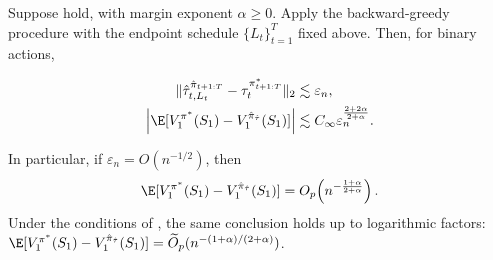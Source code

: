 \documentclass[opre,nonblindrev]{informs4}
\newif\ifonecolumnequations
\newcommand{\az}[1]{{\color{purple} [\textbf{az:}~#1]}}
\newcommand{\norm}[1]{\lVert#1\rVert}
\newcommand{\blipadv}{\tau}
\begin{document}
\begin{theorem}\label{thm-policy-optimization}
Suppose
hold, with margin exponent $\alpha\geq0$. Apply the backward-greedy procedure
with the endpoint schedule $\{L_t\}_{t=1}^T$ fixed above. Then, for binary
actions,
\ifonecolumnequations
\begin{equation*}
\norm{
\hat\blipadv_{t,L_t}^{\hat\pi_{t+1:T}}
-\blipadv_t^{\pi^*_{t+1:T}}
}_2
\lesssim \varepsilon_n,
\qquad
\abs{\E[V_1^{\pi^*}(S_1)-V_1^{\hat\pi_{\hat\blipadv}}(S_1)]}
\lesssim C_\infty \varepsilon_n^{\frac{2+2\alpha}{2+\alpha}}.
\end{equation*}
\else
\begin{align*}
\norm{
\hat\blipadv_{t,L_t}^{\hat\pi_{t+1:T}}
-\blipadv_t^{\pi^*_{t+1:T}}
}_2
&\lesssim \varepsilon_n,\\
\abs{\E[V_1^{\pi^*}(S_1)-V_1^{\hat\pi_{\hat\blipadv}}(S_1)]}
&\lesssim
C_\infty \varepsilon_n^{\frac{2+2\alpha}{2+\alpha}}.
\end{align*}
\fi
In particular, if $\varepsilon_n=O(n^{-1/2})$, then
\begin{equation*}
\E[V_1^{\pi^*}(S_1)-V_1^{\hat\pi_{\hat\blipadv}}(S_1)]
=
O_p\!\left(n^{-\frac{1+\alpha}{2+\alpha}}\right).
\end{equation*}
Under the conditions of , the same conclusion
holds up to logarithmic factors:
$\E[V_1^{\pi^*}(S_1)-V_1^{\hat\pi_{\hat\blipadv}}(S_1)]
=\widetilde O_p(n^{-(1+\alpha)/(2+\alpha)})$.




\end{theorem}
\end{document}
